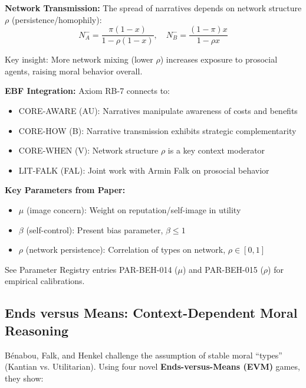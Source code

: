 \textbf{Network Transmission:} The spread of narratives depends on network structure $\rho$ (persistence/homophily):
\begin{equation}
N^-_A = \frac{\pi(1-x)}{1 - \rho(1-x)}, \quad N^-_B = \frac{(1-\pi)x}{1 - \rho x}
\label{eq:rb-network}
\end{equation}

Key insight: More network mixing (lower $\rho$) increases exposure to prosocial agents, raising moral behavior overall.

\textbf{EBF Integration:} Axiom RB-7 connects to:
\begin{itemize}
    \item CORE-AWARE (AU): Narratives manipulate awareness of costs and benefits
    \item CORE-HOW (B): Narrative transmission exhibits strategic complementarity
    \item CORE-WHEN (V): Network structure $\rho$ is a key context moderator
    \item LIT-FALK (FAL): Joint work with Armin Falk on prosocial behavior
\end{itemize}

\textbf{Key Parameters from Paper:}
\begin{itemize}
    \item $\mu$ (image concern): Weight on reputation/self-image in utility
    \item $\beta$ (self-control): Present bias parameter, $\beta \leq 1$
    \item $\rho$ (network persistence): Correlation of types on network, $\rho \in [0,1]$
\end{itemize}

See Parameter Registry entries PAR-BEH-014 ($\mu$) and PAR-BEH-015 ($\rho$) for empirical calibrations.

\subsection{Ends versus Means: Context-Dependent Moral Reasoning}
\label{subsec:rb-ends-means}

Bénabou, Falk, and Henkel \citep{benabou_2024_ends_means} challenge the assumption of stable moral ``types'' (Kantian vs. Utilitarian). Using four novel \textbf{Ends-versus-Means (EVM)} games, they show:

